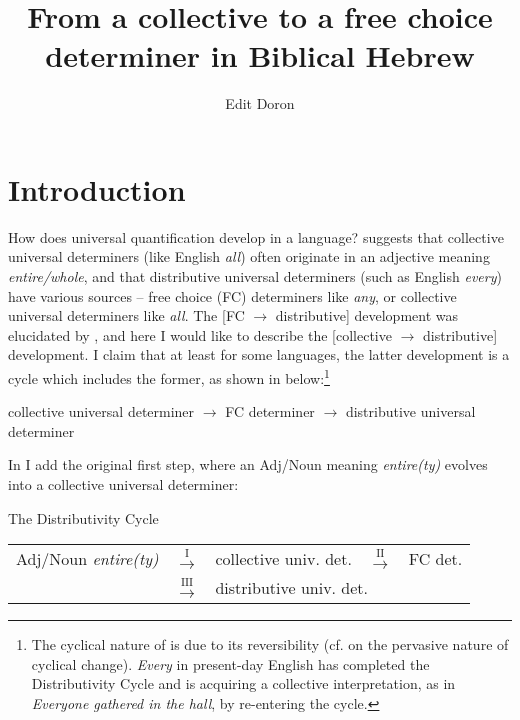 \documentclass[output=paper]{langsci/langscibook}
\title{From a collective to a free choice determiner in Biblical Hebrew}
\author{Edit Doron\affiliation{Hebrew University of Jerusalem}}
\begin{document}
\maketitle

\section{Introduction}%
\largerpage
How does universal quantification develop in a language? \citet{Haspelmath1995}  suggests that collective universal determiners (like English \textit{all}) often originate in an adjective meaning \textit{entire/whole}, and that distributive universal determiners (such as English \textit{every}) have various sources – free choice (FC) determiners like \textit{any}, or collective universal determiners like \textit{all}. The [FC ${\rightarrow}$ distributive] development was elucidated by \citet{Beck2017}, and here I would like to describe the [collective ${\rightarrow}$ distributive] development. I claim that at least for some languages, the latter development is a cycle which includes the former, as shown in  below:{\footnote{The cyclical nature of  is due to its reversibility (cf. \citealt{Gelderen2011} on the pervasive nature of cyclical change). \textit{Every} in present-day English has completed the Distributivity Cycle and is acquiring a collective interpretation, as in \textit{Everyone gathered in the hall}, by re-entering the cycle.}}

\ea%
    \label{ex:doron:1}
            collective universal determiner  ${\rightarrow}$   FC determiner  ${\rightarrow}$  distributive universal determiner
\z


In  I add the original first step, where an Adj/Noun meaning \textit{entire(ty)} \linebreak evolves into a collective universal determiner:

\ea%
    The Distributivity Cycle\label{ex:doron:2}\\\relax
                   \begin{tabular}{@{}lclcl@{}}
                   Adj/Noun \textit{entire(ty)} & $\stackrel{\text{I}}{\rightarrow}$  &  collective univ. det. & $\stackrel{\text{II}}{\rightarrow}$ &  FC det.\\
                                                & $\stackrel{\text{III}}{\rightarrow}$ & \multicolumn{3}{l}{distributive univ. det.}\\
                   \end{tabular}
\z
\end{document}
